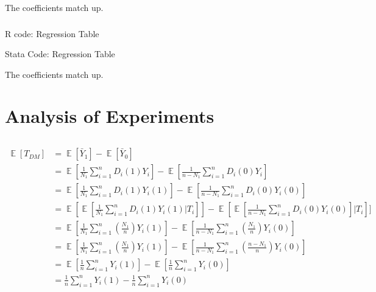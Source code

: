 \documentclass[12pt]{article}
\begin{document}
The coefficients match up.

\subsubsection{}
\begin{center}
  R code: Regression Table
  \par
  
  \newpage
  \par
  Stata Code: Regression Table
  \par
  
\end{center}
The coefficients match up.
\newpage

\section{Analysis of Experiments}
\subsection{}
\subsubsection{}
\begin{equation}
\begin{split}
\mathop{\mathbb{E}}[T_{DM}] & = \mathop{\mathbb{E}}[\bar{Y}_1] - \mathop{\mathbb{E}}[\bar{Y}_0] \\
& = \mathop{\mathbb{E}}[\frac{1}{N_1} \sum_{i=1}^{n} D_i (1) Y_i] - \mathop{\mathbb{E}}[\frac{1}{n - N_1} \sum_{i=1}^{n} D_i (0) Y_i] \\
 & = \mathop{\mathbb{E}}[\frac{1}{N_1} \sum_{i=1}^{n} D_i(1)Y_i(1)] - \mathop{\mathbb{E}}[\frac{1}{n-N_1} \sum_{i=1}^{n}D_i(0)Y_i(0)] \\
 & = \mathop{\mathbb{E}}[\mathop{\mathbb{E}}[\frac{1}{N_1} \sum_{i=1}^{n} D_i(1)Y_i(1)|T_i]] - \mathop{\mathbb{E}}[\mathop{\mathbb{E}}[\frac{1}{n-N_1} \sum_{i=1}^{n} D_i(0)Y_i(0)]|T_i]] \\
 & = \mathop{\mathbb{E}}[\frac{1}{N_1} \sum_{i=1}^{n} \left( \frac{N_1}{n} \right)    Y_i(1)] - \mathop{\mathbb{E}}[\frac{1}{n-N_1} \sum_{i=1}^{n}    \left( \frac{N_1}{n} \right) Y_i(0)] \\
 & = \mathop{\mathbb{E}}[\frac{1}{N_1} \sum_{i=1}^{n} \left( \frac{N_1}{n} \right)    Y_i(1)] - \mathop{\mathbb{E}}[\frac{1}{n-N_1} \sum_{i=1}^{n}    \left( \frac{n- N_1}{n} \right) Y_i(0)] \\
  & = \mathop{\mathbb{E}}[\frac{1}{n} \sum_{i=1}^{n}Y_i(1)] - \mathop{\mathbb{E}}[\frac{1}{n} \sum_{i=1}^{n} Y_i(0)] \\
    & = \frac{1}{n} \sum_{i=1}^{n}Y_i(1) - \frac{1}{n} \sum_{i=1}^{n} Y_i(0)\\
\end{split}
\end{equation}
\end{document}
